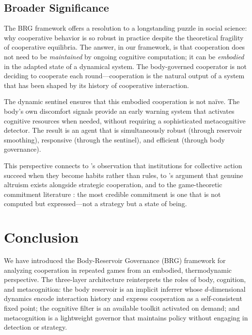 \documentclass[11pt,a4paper]{article}
\theoremstyle{definition}
\begin{document}
\subsection{Broader Significance}

The BRG framework offers a resolution to a longstanding puzzle in social
science: why cooperative behavior is so robust in practice despite the
theoretical fragility of cooperative equilibria.  The answer, in our
framework, is that cooperation does not need to be \emph{maintained} by
ongoing cognitive computation; it can be \emph{embodied} in the adapted
state of a dynamical system.  The body-governed cooperator is not deciding
to cooperate each round---cooperation is the natural output of a system
that has been shaped by its history of cooperative interaction.

The dynamic sentinel ensures that this embodied cooperation is not na\"ive.
The body's own discomfort signals provide an early warning system that
activates cognitive resources when needed, without requiring a sophisticated
metacognitive detector.  The result is an agent that is simultaneously
robust (through reservoir smoothing), responsive (through the sentinel),
and efficient (through body governance).

This perspective connects to \citet{ostrom1990}'s observation that
institutions for collective action succeed when they become habits rather
than rules, to \citet{batson2011}'s argument that genuine altruism exists
alongside strategic cooperation, and to the game-theoretic commitment
literature \citep{frank1988, nesse2001}: the most credible commitment is
one that is not computed but expressed---not a strategy but a state of
being.


\section{Conclusion}
\label{sec:conclusion}

We have introduced the Body-Reservoir Governance (BRG) framework for
analyzing cooperation in repeated games from an embodied, thermodynamic
perspective.  The three-layer architecture reinterprets the roles of body,
cognition, and metacognition: the body reservoir is an implicit inferrer
whose $d$-dimensional dynamics encode interaction history and express
cooperation as a self-consistent fixed point; the cognitive filter is
an available toolkit activated on demand; and metacognition is a lightweight
governor that maintains policy without engaging in detection or strategy.
\end{document}

